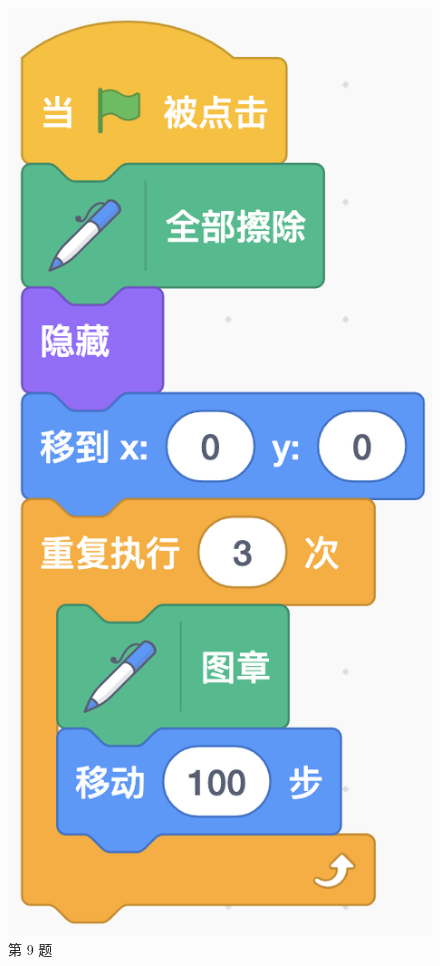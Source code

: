 \documentclass[10pt, a4paper]{article}
\begin{document}
\begin{enumerate}
\begin{figure}[htbp]
\begin{minipage}[t]{.15\textwidth}
            \end{minipage}
            \begin{minipage}[t]{.13\textwidth}
                \centering
                \includegraphics[width=\textwidth]{9.png}
                \caption*{第 9 题}
            \end{minipage}
        \end{figure}


\end{enumerate}
\end{document}
